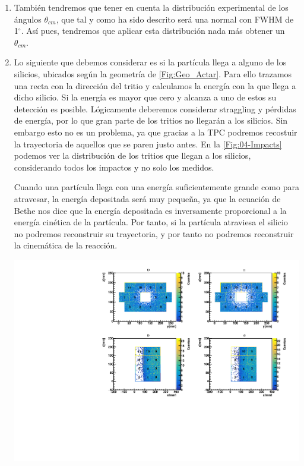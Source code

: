 \begin{enumerate}
\begin{minipage}{0.49\linewidth}
        \label{Fig:04-kinSampled2}
    \end{minipage}

    \item También tendremos que tener en cuenta la distribución experimental de los ángulos $\theta_{cm}$, que tal y como ha sido descrito será una normal con FWHM de 1$^{\circ}$. Así pues, tendremos que aplicar esta distribución nada más obtener un $\theta_{cm}$. 

    
    \item Lo siguiente que debemos considerar es si la partícula llega a alguno de los silicios, ubicados según la geometría de \cref{Fig:Geo_Actar}. Para ello trazamos una recta con la dirección del tritio y calculamos la energía con la que llega a dicho silicio. Si la energía es mayor que cero y alcanza a uno de estos su detección es posible. Lógicamente deberemos considerar straggling y pérdidas de energía, por lo que gran parte de los tritios no llegarán a los silicios. Sin embargo esto no es un problema, ya que gracias a la TPC podremos recostuir la trayectoria de aquellos que se paren justo antes. En la \cref{Fig:04-Impacts} podemos ver la distribución de los tritios que llegan a los silicios, considerando todos los impactos y no solo los medidos. 
    
    Cuando una partícula llega con una energía suficientemente grande como para atravesar, la energía depositada será muy pequeña, ya que la ecuación de Bethe nos dice que la energía depositada es inversamente proporcional a la energía cinética de la partícula. Por tanto, si la partícula atraviesa el silicio no podremos reconstruir su trayectoria, y por tanto no podremos reconstruir la cinemática de la reacción. 

    \begin{center}
        \includegraphics[width=0.95\linewidth]{Imagenes/Impacts/Impacts_Ex0.00_incIdx0.pdf}


\end{center}
\end{enumerate}
